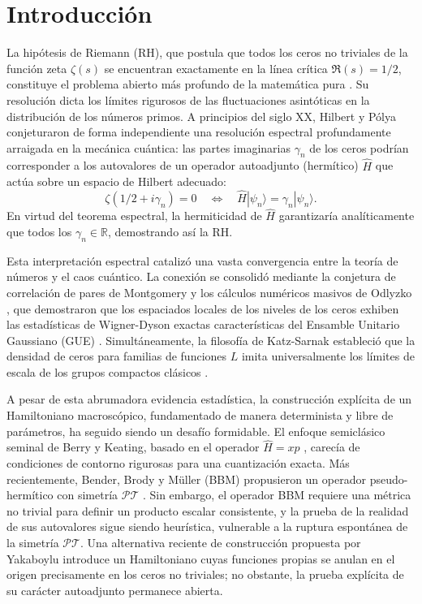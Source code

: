 \documentclass[aps,prl,preprint,superscriptaddress,floatfix]{revtex4-2}
\begin{document}
\maketitle

\section{Introducción}

La hipótesis de Riemann (RH), que postula que todos los ceros no triviales de la función zeta $\zeta(s)$ se encuentran exactamente en la línea crítica $\Re(s) = 1/2$, constituye el problema abierto más profundo de la matemática pura \cite{Riemann1859}. Su resolución dicta los límites rigurosos de las fluctuaciones asintóticas en la distribución de los números primos. A principios del siglo XX, Hilbert y Pólya conjeturaron de forma independiente una resolución espectral profundamente arraigada en la mecánica cuántica: las partes imaginarias $\gamma_n$ de los ceros podrían corresponder a los autovalores de un operador autoadjunto (hermítico) $\hat{H}$ que actúa sobre un espacio de Hilbert adecuado:
\begin{equation}
\zeta(1/2 + i\gamma_n) = 0 \quad \Longleftrightarrow \quad \hat{H}|\psi_n\rangle = \gamma_n |\psi_n\rangle.
\end{equation}
En virtud del teorema espectral, la hermiticidad de $\hat{H}$ garantizaría analíticamente que todos los $\gamma_n \in \mathbb{R}$, demostrando así la RH.

Esta interpretación espectral catalizó una vasta convergencia entre la teoría de números y el caos cuántico. La conexión se consolidó mediante la conjetura de correlación de pares de Montgomery \cite{Montgomery1973} y los cálculos numéricos masivos de Odlyzko \cite{Odlyzko2001}, que demostraron que los espaciados locales de los niveles de los ceros exhiben las estadísticas de Wigner-Dyson exactas características del Ensamble Unitario Gaussiano (GUE) \cite{Bohigas1984}. Simultáneamente, la filosofía de Katz-Sarnak estableció que la densidad de ceros para familias de funciones $L$ imita universalmente los límites de escala de los grupos compactos clásicos \cite{KatzSarnak1999}.

A pesar de esta abrumadora evidencia estadística, la construcción explícita de un Hamiltoniano macroscópico, fundamentado de manera determinista y libre de parámetros, ha seguido siendo un desafío formidable. El enfoque semiclásico seminal de Berry y Keating, basado en el operador $\hat{H} = xp$ \cite{BerryKeating1999}, carecía de condiciones de contorno rigurosas para una cuantización exacta. Más recientemente, Bender, Brody y Müller (BBM) propusieron un operador pseudo-hermítico con simetría $\mathcal{PT}$ \cite{Bender2017}. Sin embargo, el operador BBM requiere una métrica no trivial para definir un producto escalar consistente, y la prueba de la realidad de sus autovalores sigue siendo heurística, vulnerable a la ruptura espontánea de la simetría $\mathcal{PT}$. Una alternativa reciente de construcción propuesta por Yakaboylu \cite{Yakaboylu2024} introduce un Hamiltoniano cuyas funciones propias se anulan en el origen precisamente en los ceros no triviales; no obstante, la prueba explícita de su carácter autoadjunto permanece abierta.
\end{document}
